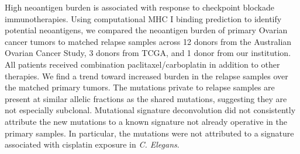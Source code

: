 High neoantigen burden is associated with response to checkpoint blockade immunotherapies. Using computational MHC I binding prediction to identify potential neoantigens, we compared the neoantigen burden of primary Ovarian cancer tumors to matched relapse samples across 12 donors from the Australian Ovarian Cancer Study, 3 donors from TCGA, and 1 donor from our institution. All patients received combination paclitaxel/carboplatin in addition to other therapies. We find a trend toward increased burden in the relapse samples over the matched primary tumors. The mutations private to relapse samples are present at similar allelic fractions as the shared mutations, suggesting they are not especially subclonal. Mutational signature deconvolution did not consistently attribute the new mutations to a known signature not already operative in the primary samples. In particular, the mutations were not attributed to a signature associated with cisplatin exposure in \textit{C. Elegans}.

